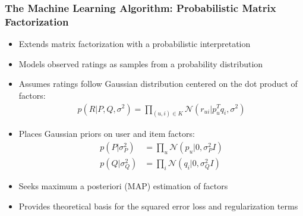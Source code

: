\documentclass{beamer}
\begin{document}
\begin{frame}
\frametitle{The Machine Learning Algorithm: Probabilistic Matrix Factorization}

\begin{itemize}
    \item Extends matrix factorization with a probabilistic interpretation
    \item Models observed ratings as samples from a probability distribution
    \item Assumes ratings follow Gaussian distribution centered on the dot product of factors:
    \begin{align*}
    p(R|P,Q,\sigma^2) = \prod_{(u,i) \in K} \mathcal{N}(r_{ui} | p_u^T q_i, \sigma^2)
    \end{align*}
    \item Places Gaussian priors on user and item factors:
    \begin{align*}
    p(P|\sigma_P^2) &= \prod_{u} \mathcal{N}(p_u | 0, \sigma_P^2 I) \\
    p(Q|\sigma_Q^2) &= \prod_{i} \mathcal{N}(q_i | 0, \sigma_Q^2 I)
    \end{align*}
    \item Seeks maximum a posteriori (MAP) estimation of factors
    \item Provides theoretical basis for the squared error loss and regularization terms
\end{itemize}
\end{frame}
\end{document}
